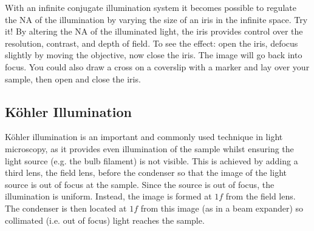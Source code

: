 \documentclass[a4paper]{report}
\newcommand{\nexercise}[0]{\arabic{exercises}\addtocounter{exercises}{1}}
\begin{document}



\begin{exercisebox}[frametitle={Exercise \nexercise: Illumination angle}]
With an infinite conjugate illumination system it becomes possible to regulate the NA of the illumination by varying the size of an iris in the infinite space. 
Try it!
By altering the NA of the illuminated light, the iris provides control over the resolution, contrast, and depth of field.
To see the effect: open the iris, defocus slightly by moving the objective, now close the iris. The image will go back into focus. 
You could also draw a cross on a coverslip with a marker and lay over your sample, then open and close the iris.
\end{exercisebox}
%



\clearpage

\subsection{K\"{o}hler Illumination}
K\"{o}hler illumination is an important and commonly used technique in light microscopy, as it provides even illumination of the sample whilst ensuring the light source (e.g. the bulb filament) is not visible. 
This is achieved by adding a third lens, the field lens, before the condenser so that the image of the light source is out of focus at the sample. 
Since the source is out of focus, the illumination is uniform. 
Instead, the image is formed at $1f$ from the field lens. 
The condenser is then located at $1f$ from this image (as in a beam expander) so collimated (i.e. out of focus) light reaches the sample. 
\end{document}
